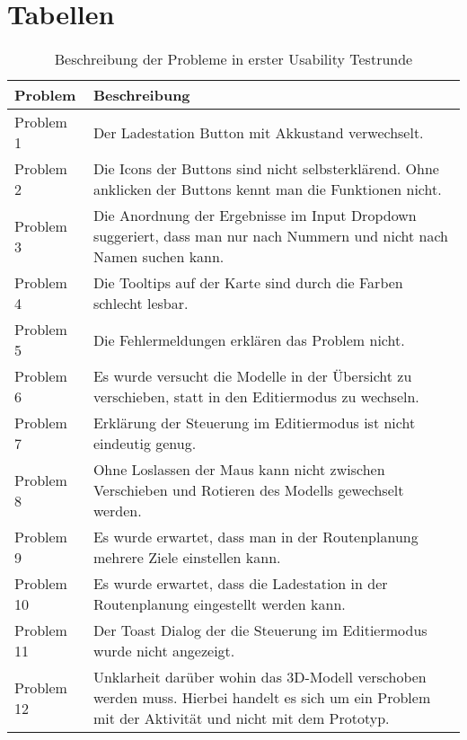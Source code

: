 \section{Tabellen}
\begin{table}[H]
    \caption{Beschreibung der Probleme in erster Usability Testrunde}\label{tbl:1stUsabilityTestsProblemsDesc}
    \begin{tabular}{l|l}
        Problem     & Beschreibung \\ \hline
        Problem 1   & \multicolumn{1}{p{12cm}}{Der Ladestation Button mit Akkustand verwechselt.} \\ \hline
        Problem 2   & \multicolumn{1}{p{12cm}}{Die Icons der Buttons sind nicht selbsterklärend. Ohne anklicken der Buttons kennt man die Funktionen nicht.} \\ \hline
        Problem 3   & \multicolumn{1}{p{12cm}}{Die Anordnung der Ergebnisse im Input Dropdown suggeriert, dass man nur nach Nummern und nicht nach Namen suchen kann.} \\ \hline
        Problem 4   & \multicolumn{1}{p{12cm}}{Die Tooltips auf der Karte sind durch die Farben schlecht lesbar.} \\ \hline
        Problem 5   & \multicolumn{1}{p{12cm}}{Die Fehlermeldungen erklären das Problem nicht.} \\ \hline
        Problem 6   & \multicolumn{1}{p{12cm}}{Es wurde versucht die Modelle in der Übersicht zu verschieben, statt in den Editiermodus zu wechseln.} \\ \hline
        Problem 7   & \multicolumn{1}{p{12cm}}{Erklärung der Steuerung im Editiermodus ist nicht eindeutig genug.} \\ \hline
        Problem 8   & \multicolumn{1}{p{12cm}}{Ohne Loslassen der Maus kann nicht zwischen Verschieben und Rotieren des Modells gewechselt werden.} \\ \hline
        Problem 9   & \multicolumn{1}{p{12cm}}{Es wurde erwartet, dass man in der Routenplanung mehrere Ziele einstellen kann.} \\ \hline
        Problem 10  & \multicolumn{1}{p{12cm}}{Es wurde erwartet, dass die Ladestation in der Routenplanung eingestellt werden kann.} \\ \hline
        Problem 11  & \multicolumn{1}{p{12cm}}{Der Toast Dialog der die Steuerung im Editiermodus wurde nicht angezeigt.} \\ \hline
        Problem 12  & \multicolumn{1}{p{12cm}}{Unklarheit darüber wohin das 3D-Modell verschoben werden muss. Hierbei handelt es sich um ein Problem mit der Aktivität und nicht mit dem Prototyp.} \\ \hline

\end{tabular}
\end{table}
